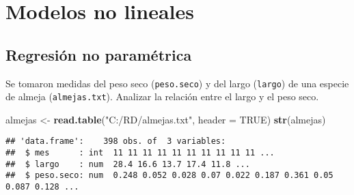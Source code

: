 \documentclass[
]{book}
\newenvironment{Shaded}{\begin{snugshade}}{\end{snugshade}}
\newcommand{\CommentTok}[1]{\textcolor[rgb]{0.56,0.35,0.01}{\textit{#1}}}
\newcommand{\DataTypeTok}[1]{\textcolor[rgb]{0.13,0.29,0.53}{#1}}
\newcommand{\DecValTok}[1]{\textcolor[rgb]{0.00,0.00,0.81}{#1}}
\newcommand{\KeywordTok}[1]{\textcolor[rgb]{0.13,0.29,0.53}{\textbf{#1}}}
\newcommand{\NormalTok}[1]{#1}
\newcommand{\OperatorTok}[1]{\textcolor[rgb]{0.81,0.36,0.00}{\textbf{#1}}}
\newcommand{\OtherTok}[1]{\textcolor[rgb]{0.56,0.35,0.01}{#1}}
\newcommand{\StringTok}[1]{\textcolor[rgb]{0.31,0.60,0.02}{#1}}
\begin{document}
\hypertarget{modelos-no-lineales}{%
\chapter{Modelos no lineales}\label{modelos-no-lineales}}

\hypertarget{regresiuxf3n-no-paramuxe9trica}{%
\section{Regresión no paramétrica}\label{regresiuxf3n-no-paramuxe9trica}}

Se tomaron medidas del peso seco (\texttt{peso.seco}) y del largo (\texttt{largo}) de una especie de almeja (\texttt{almejas.txt}). Analizar la relación entre el largo y el peso seco.

\begin{Shaded}
\begin{Highlighting}[]
\NormalTok{almejas <-}\StringTok{ }\KeywordTok{read.table}\NormalTok{(}\StringTok{"C:/RD/almejas.txt"}\NormalTok{, }\DataTypeTok{header =} \OtherTok{TRUE}\NormalTok{)}
\KeywordTok{str}\NormalTok{(almejas)}
\end{Highlighting}
\end{Shaded}

\begin{verbatim}
## 'data.frame':    398 obs. of  3 variables:
##  $ mes      : int  11 11 11 11 11 11 11 11 11 11 ...
##  $ largo    : num  28.4 16.6 13.7 17.4 11.8 ...
##  $ peso.seco: num  0.248 0.052 0.028 0.07 0.022 0.187 0.361 0.05 0.087 0.128 ...
\end{verbatim}

\begin{Shaded}
\end{Shaded}
\end{document}
